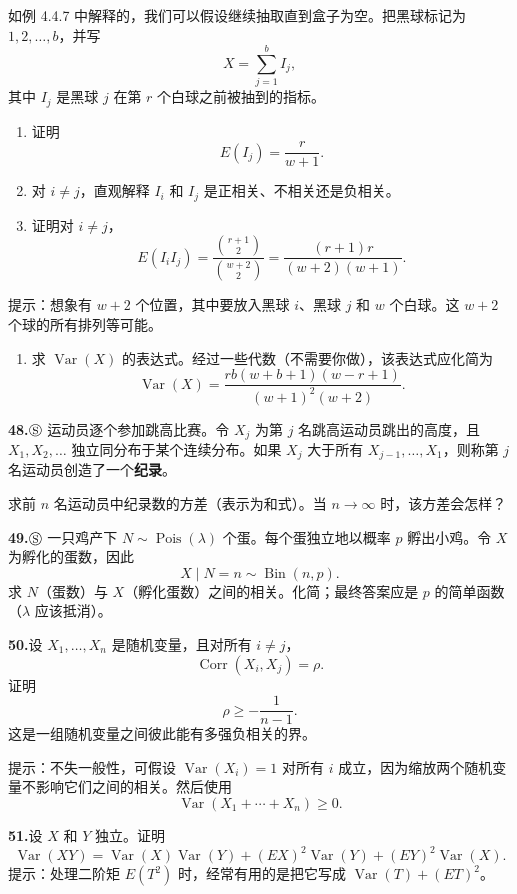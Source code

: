 \documentclass[UTF8,12pt,a4paper,fontset=fandol]{ctexart}
\begin{document}
如例 4.4.7 中解释的，我们可以假设继续抽取直到盒子为空。把黑球标记为 $1,2,\ldots,b$，并写
\[
  X=\sum_{j=1}^{b}I_j,
\]
其中 $I_j$ 是黑球 $j$ 在第 $r$ 个白球之前被抽到的指标。
\begin{enumerate}
  \item[(a)] 证明
  \[
    E(I_j)=\frac{r}{w+1}.
  \]
  \item[(b)] 对 $i\ne j$，直观解释 $I_i$ 和 $I_j$ 是正相关、不相关还是负相关。
  \item[(c)] 证明对 $i\ne j$，
  \[
    E(I_iI_j)=\frac{{r+1\choose 2}}{{w+2\choose 2}}
    =\frac{(r+1)r}{(w+2)(w+1)}.
  \]
\end{enumerate}
提示：想象有 $w+2$ 个位置，其中要放入黑球 $i$、黑球 $j$ 和 $w$ 个白球。这 $w+2$ 个球的所有排列等可能。
\begin{enumerate}
  \item[(d)] 求 $\operatorname{Var}(X)$ 的表达式。经过一些代数（不需要你做），该表达式应化简为
  \[
    \operatorname{Var}(X)=\frac{rb(w+b+1)(w-r+1)}{(w+1)^2(w+2)}.
  \]
\end{enumerate}

\noindent\textbf{48.}\quad $\circledS$ 运动员逐个参加跳高比赛。令 $X_j$ 为第 $j$ 名跳高运动员跳出的高度，且 $X_1,X_2,\ldots$ 独立同分布于某个连续分布。如果 $X_j$ 大于所有 $X_{j-1},\ldots,X_1$，则称第 $j$ 名运动员创造了一个\textbf{纪录}。

求前 $n$ 名运动员中纪录数的方差（表示为和式）。当 $n\to\infty$ 时，该方差会怎样？

\noindent\textbf{49.}\quad $\circledS$ 一只鸡产下 $N\sim \operatorname{Pois}(\lambda)$ 个蛋。每个蛋独立地以概率 $p$ 孵出小鸡。令 $X$ 为孵化的蛋数，因此
\[
  X\mid N=n\sim \operatorname{Bin}(n,p).
\]
求 $N$（蛋数）与 $X$（孵化蛋数）之间的相关。化简；最终答案应是 $p$ 的简单函数（$\lambda$ 应该抵消）。

\noindent\textbf{50.}\quad 设 $X_1,\ldots,X_n$ 是随机变量，且对所有 $i\ne j$，
\[
  \operatorname{Corr}(X_i,X_j)=\rho.
\]
证明
\[
  \rho\ge -\frac{1}{n-1}.
\]
这是一组随机变量之间彼此能有多强负相关的界。

提示：不失一般性，可假设 $\operatorname{Var}(X_i)=1$ 对所有 $i$ 成立，因为缩放两个随机变量不影响它们之间的相关。然后使用
\[
  \operatorname{Var}(X_1+\cdots+X_n)\ge 0.
\]

\noindent\textbf{51.}\quad 设 $X$ 和 $Y$ 独立。证明
\[
  \operatorname{Var}(XY)=\operatorname{Var}(X)\operatorname{Var}(Y)+(EX)^2\operatorname{Var}(Y)+(EY)^2\operatorname{Var}(X).
\]
提示：处理二阶矩 $E(T^2)$ 时，经常有用的是把它写成 $\operatorname{Var}(T)+(ET)^2$。
\end{document}
